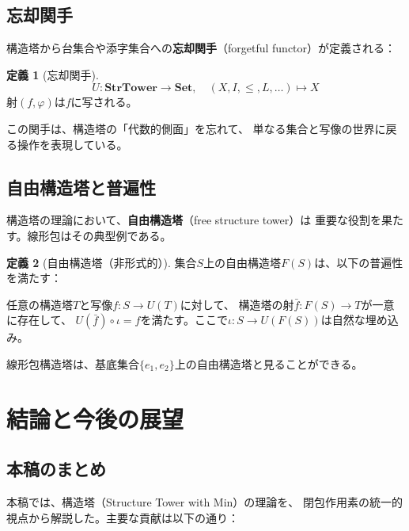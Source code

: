 \documentclass[a4paper,12pt]{ltjsarticle}
\theoremstyle{definition}
\newtheorem{definition}{定義}[section]
\begin{document}
\subsection{忘却関手}

構造塔から台集合や添字集合への\textbf{忘却関手}（forgetful functor）が定義される：

\begin{definition}[忘却関手]
\[
U: \mathbf{StrTower} \to \mathbf{Set}, \quad
(X, I, \leq, L, \ldots) \mapsto X
\]
射$(f, \varphi)$は$f$に写される。
\end{definition}

この関手は、構造塔の「代数的側面」を忘れて、
単なる集合と写像の世界に戻る操作を表現している。

\subsection{自由構造塔と普遍性}

構造塔の理論において、\textbf{自由構造塔}（free structure tower）は
重要な役割を果たす。線形包はその典型例である。

\begin{definition}[自由構造塔（非形式的）]
集合$S$上の自由構造塔$F(S)$は、以下の普遍性を満たす：

任意の構造塔$T$と写像$f: S \to U(T)$に対して、
構造塔の射$\bar{f}: F(S) \to T$が一意に存在して、
$U(\bar{f}) \circ \iota = f$を満たす。ここで$\iota: S \to U(F(S))$は自然な埋め込み。
\end{definition}


線形包構造塔は、基底集合$\{e_1, e_2\}$上の自由構造塔と見ることができる。

\section{結論と今後の展望}

\subsection{本稿のまとめ}

本稿では、構造塔（Structure Tower with Min）の理論を、
閉包作用素の統一的視点から解説した。主要な貢献は以下の通り：
\end{document}
